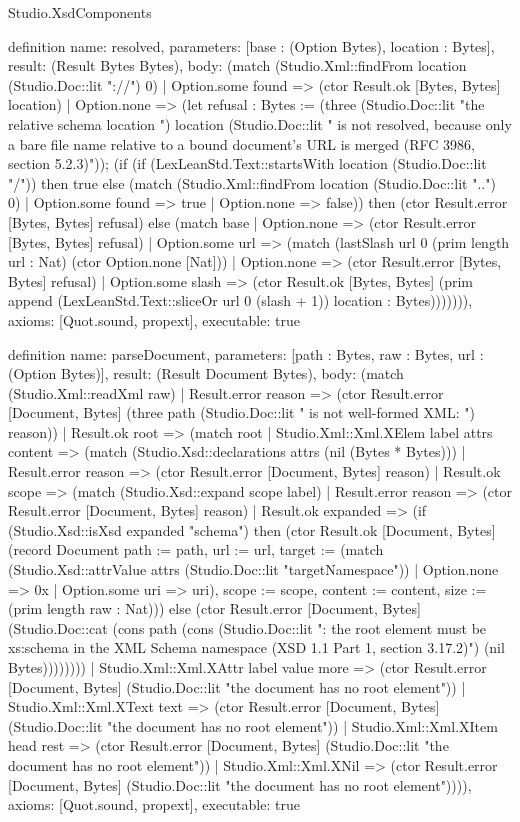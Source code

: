 \begin{lexlean}{Studio.XsdComponents}
\begin{semanticmodule}
definition{
  name: resolved,
  parameters: [base : (Option Bytes), location : Bytes],
  result: (Result Bytes Bytes),
  body: (match (Studio.Xml::findFrom location (Studio.Doc::lit "://") 0)
    | Option.some found => (ctor Result.ok [Bytes, Bytes] location)
    | Option.none => (let refusal : Bytes := (three (Studio.Doc::lit "the relative schema location ") location (Studio.Doc::lit " is not resolved, because only a bare file name relative to a bound document's URL is merged (RFC 3986, section 5.2.3)")); (if (if (LexLeanStd.Text::startsWith location (Studio.Doc::lit "/")) then true else (match (Studio.Xml::findFrom location (Studio.Doc::lit "..") 0)
      | Option.some found => true
      | Option.none => false)) then (ctor Result.error [Bytes, Bytes] refusal) else (match base
      | Option.none => (ctor Result.error [Bytes, Bytes] refusal)
      | Option.some url => (match (lastSlash url 0 (prim length url : Nat) (ctor Option.none [Nat]))
        | Option.none => (ctor Result.error [Bytes, Bytes] refusal)
        | Option.some slash => (ctor Result.ok [Bytes, Bytes] (prim append (LexLeanStd.Text::sliceOr url 0 (slash + 1)) location : Bytes))))))),
  axioms: [Quot.sound, propext],
  executable: true
}

definition{
  name: parseDocument,
  parameters: [path : Bytes, raw : Bytes, url : (Option Bytes)],
  result: (Result Document Bytes),
  body: (match (Studio.Xml::readXml raw)
    | Result.error reason => (ctor Result.error [Document, Bytes] (three path (Studio.Doc::lit " is not well-formed XML: ") reason))
    | Result.ok root => (match root
      | Studio.Xml::Xml.XElem label attrs content => (match (Studio.Xsd::declarations attrs (nil (Bytes * Bytes)))
        | Result.error reason => (ctor Result.error [Document, Bytes] reason)
        | Result.ok scope => (match (Studio.Xsd::expand scope label)
          | Result.error reason => (ctor Result.error [Document, Bytes] reason)
          | Result.ok expanded => (if (Studio.Xsd::isXsd expanded "schema") then (ctor Result.ok [Document, Bytes] (record Document {path := path, url := url, target := (match (Studio.Xsd::attrValue attrs (Studio.Doc::lit "targetNamespace"))
            | Option.none => 0x
            | Option.some uri => uri), scope := scope, content := content, size := (prim length raw : Nat)})) else (ctor Result.error [Document, Bytes] (Studio.Doc::cat (cons path (cons (Studio.Doc::lit ": the root element must be xs:schema in the XML Schema namespace (XSD 1.1 Part 1, section 3.17.2)") (nil Bytes))))))))
      | Studio.Xml::Xml.XAttr label value more => (ctor Result.error [Document, Bytes] (Studio.Doc::lit "the document has no root element"))
      | Studio.Xml::Xml.XText text => (ctor Result.error [Document, Bytes] (Studio.Doc::lit "the document has no root element"))
      | Studio.Xml::Xml.XItem head rest => (ctor Result.error [Document, Bytes] (Studio.Doc::lit "the document has no root element"))
      | Studio.Xml::Xml.XNil => (ctor Result.error [Document, Bytes] (Studio.Doc::lit "the document has no root element")))),
  axioms: [Quot.sound, propext],
  executable: true
}


\end{semanticmodule}
\end{lexlean}
